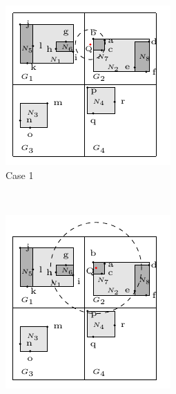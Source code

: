\begin{figure}[t]
  \centering
  \begin{subfigure}[b]{.33\linewidth}
    \centering
    \includegraphics[width=\linewidth]{figs/knn/case1.pdf}
    \caption{Case 1}\label{fig:knn:cases:case1}
  \end{subfigure}~%
  \begin{subfigure}[b]{.33\linewidth}
    \centering
    \includegraphics[width=\linewidth]{figs/knn/case2.pdf}

\end{subfigure}
\end{figure}
